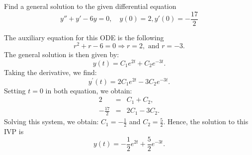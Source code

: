 \documentclass[11pt]{article}
\begin{document}
\begin{problem}
Find a general solution to the given differential equation
\begin{equation*}
y'' +y' -6y =0, \quad y(0)=2, y'(0)=-\frac{17}{2}
\end{equation*}
\end{problem}
\begin{solution}
The auxiliary equation for this ODE is the following
\begin{equation*}
r^2 +r -6 =0 \Rightarrow r = 2, \,\, \text{and} \,\,r = -3.
\end{equation*}
The general solution is then given by:
\begin{equation*}
y(t) = C_{1} e^{2 t} + C_{2} e^{-3 t}.
\end{equation*}
Taking the derivative, we find:
\begin{equation*}
y^{\prime}(t) = 2C_{1}  e^{2 t} - 3C_{2} e^{ -3 t}.
\end{equation*}
Setting $t=0$ in both equation, we obtain:
\begin{eqnarray*}
2 &=& C_{1} + C_{2} ,\\
-\frac{17}{2} &=& 2C_{1} - 3C_{2} .
\end{eqnarray*}
Solving this system, we obtain: $C_{1} = -\frac{1}{2}$ and $C_{2} = \frac{5}{2}$.
Hence, the solution to this IVP is
\begin{equation*}
\boxed{ y(t) = -\dfrac{1}{2} e^{2 t} + \dfrac{5}{2} e^{-3 t}}.
\end{equation*}
\end{solution}
\end{document}
